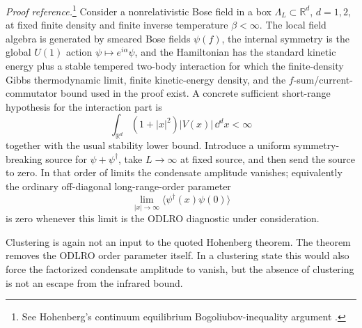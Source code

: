 \begin{quotedtheorem}
\label{qthm:hohenberg-bose-no-odlro}
\emph{Proof reference.}\footnote{See Hohenberg's continuum equilibrium
Bogoliubov-inequality argument \cite{Hohenberg1967}.}
Consider a nonrelativistic Bose field in a box
\(\Lambda_L\subset\mathbb R^d\), \(d=1,2\), at fixed finite density and finite
inverse temperature \(\beta<\infty\).  The local field algebra is generated by
smeared Bose fields \(\psi(f)\), the internal symmetry is the global
\(U(1)\) action \(\psi\mapsto e^{i\alpha}\psi\), and the Hamiltonian has the
standard kinetic energy plus a stable tempered two-body interaction for which
the finite-density Gibbs thermodynamic limit, finite kinetic-energy density,
and the \(f\)-sum/current-commutator bound used in the proof exist.  A concrete
sufficient short-range hypothesis for the interaction part is
\[
  \int_{\mathbb R^d}(1+|x|^2)|V(x)|\,\dd^d x<\infty
\]
together with the usual stability lower bound.  Introduce a uniform
symmetry-breaking source for \(\psi+\psi^\dagger\), take \(L\to\infty\) at
fixed source, and then send the source to zero.  In that order of limits the
condensate amplitude vanishes; equivalently the ordinary off-diagonal
long-range-order parameter
\[
  \lim_{|x|\to\infty}\langle\psi^\dagger(x)\psi(0)\rangle
\]
is zero whenever this limit is the ODLRO diagnostic under consideration.
\end{quotedtheorem}

Clustering is again not an input to the quoted Hohenberg theorem.  The theorem
removes the ODLRO order parameter itself.  In a clustering state this would
also force the factorized condensate amplitude to vanish, but the absence of
clustering is not an escape from the infrared bound.

